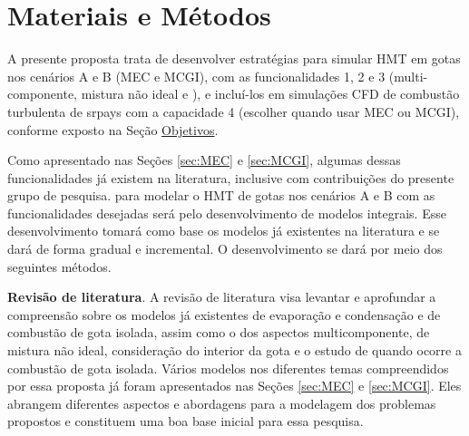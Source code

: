 

\section{Materiais e Métodos} \label{sec:metod}

A presente proposta trata de desenvolver estratégias para simular HMT em gotas nos cenários {A} e {B} (MEC e MCGI), com as funcionalidades {1}, {2} e {3} (multi-componente, mistura não ideal e ), e incluí-los em simulações CFD de combustão turbulenta de srpays com a capacidade 4 (escolher quando usar MEC ou MCGI), conforme exposto na Seção \hyperref[sec:objetivos]{Objetivos}.

Como apresentado nas Seções \ref{sec:MEC} e \ref{sec:MCGI}, algumas dessas funcionalidades já existem na literatura, inclusive com contribuições do presente grupo de pesquisa.
 para modelar o HMT de gotas nos cenários {A} e {B} com as funcionalidades desejadas será pelo desenvolvimento de modelos integrais.
Esse desenvolvimento tomará como base os modelos já existentes na literatura e se dará de forma gradual e incremental.
O desenvolvimento se dará por meio dos seguintes métodos.

\textbf{Revisão de literatura}. 
A revisão de literatura visa levantar e aprofundar a compreensão sobre os modelos já  existentes de evaporação e condensação e de combustão de gota isolada, assim como o dos aspectos multicomponente, de mistura não ideal, consideração do interior da gota e o estudo de quando ocorre a combustão de gota isolada.
Vários modelos nos diferentes temas compreendidos por essa proposta já foram apresentados nas Seções \ref{sec:MEC} e \ref{sec:MCGI}.
Eles abrangem diferentes aspectos e abordagens para a modelagem dos problemas propostos e constituem uma boa base inicial para essa pesquisa. 

